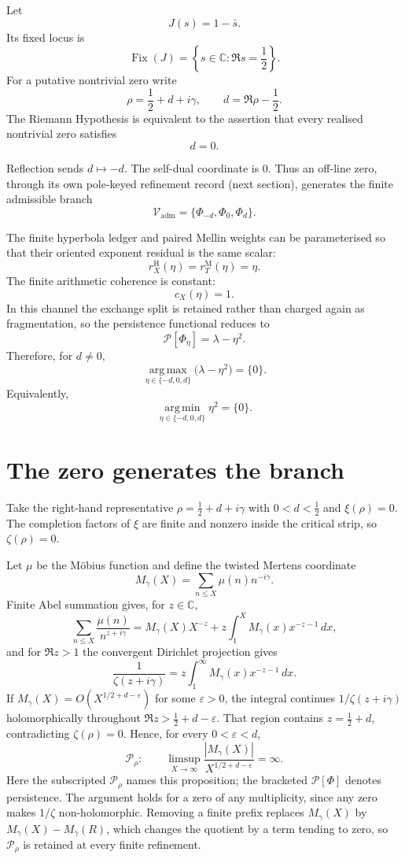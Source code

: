 \documentclass[11pt]{article}
\newcommand{\Pheart}{\mathcal P}
\newcommand{\Fix}{\operatorname{Fix}}
\newcommand{\argmax}{\operatorname*{arg\,max}}
\newcommand{\argmin}{\operatorname*{arg\,min}}
\begin{document}
Let
\[
J(s)=1-\bar s.
\]
Its fixed locus is
\[
\Fix(J)=\left\{s\in\mathbb C:\Re s=\frac12\right\}.
\]
For a putative nontrivial zero write
\[
\rho=\frac12+d+i\gamma,
\qquad
d=\Re\rho-\frac12.
\]
The Riemann Hypothesis is equivalent to the assertion that every realised nontrivial zero satisfies
\[
d=0.
\]

Reflection sends \(d\mapsto-d\). The self-dual coordinate is \(0\). Thus an off-line zero, through its own pole-keyed refinement record (next section), generates the finite admissible branch
\[
\mathcal V_{\mathrm{adm}}
=
\{\Phi_{-d},\Phi_0,\Phi_d\}.
\]

The finite hyperbola ledger and paired Mellin weights can be parameterised so that their oriented exponent residual is the same scalar:
\[
r_X^{\mathrm H}(\eta)
=
r_T^{\mathrm M}(\eta)
=
\eta.
\]
The finite arithmetic coherence is constant:
\[
c_X(\eta)=1.
\]
In this channel the exchange split is retained rather than charged again as fragmentation, so the persistence functional reduces to
\[
\Pheart[\Phi_\eta]
=
\lambda-\eta^2.
\]
Therefore, for \(d\neq0\),
\[
\argmax_{\eta\in\{-d,0,d\}}
\bigl(\lambda-\eta^2\bigr)
=
\{0\}.
\]
Equivalently,
\[
\argmin_{\eta\in\{-d,0,d\}}\eta^2=\{0\}.
\]

\section{The zero generates the branch}

Take the right-hand representative \(\rho=\frac12+d+i\gamma\) with \(0<d<\frac12\) and \(\xi(\rho)=0\). The completion factors of \(\xi\) are finite and nonzero inside the critical strip, so \(\zeta(\rho)=0\).

Let \(\mu\) be the M\"obius function and define the twisted Mertens coordinate
\[
M_\gamma(X)=\sum_{n\le X}\mu(n)n^{-i\gamma}.
\]
Finite Abel summation gives, for \(z\in\mathbb C\),
\[
\sum_{n\le X}\frac{\mu(n)}{n^{z+i\gamma}}
=
M_\gamma(X)X^{-z}
+
z\int_1^X M_\gamma(x)x^{-z-1}\,dx,
\]
and for \(\Re z>1\) the convergent Dirichlet projection gives
\[
\frac1{\zeta(z+i\gamma)}
=
z\int_1^\infty M_\gamma(x)x^{-z-1}\,dx.
\]
If \(M_\gamma(X)=O\!\left(X^{1/2+d-\varepsilon}\right)\) for some \(\varepsilon>0\), the integral continues \(1/\zeta(z+i\gamma)\) holomorphically throughout \(\Re z>\frac12+d-\varepsilon\). That region contains \(z=\frac12+d\), contradicting \(\zeta(\rho)=0\). Hence, for every \(0<\varepsilon<d\),
\[
\mathcal P_\rho:
\qquad
\limsup_{X\to\infty}
\frac{|M_\gamma(X)|}{X^{1/2+d-\varepsilon}}
=
\infty.
\]
Here the subscripted \(\mathcal P_\rho\) names this proposition; the bracketed \(\Pheart[\Phi]\) denotes persistence. The argument holds for a zero of any multiplicity, since any zero makes \(1/\zeta\) non-holomorphic. Removing a finite prefix replaces \(M_\gamma(X)\) by \(M_\gamma(X)-M_\gamma(R)\), which changes the quotient by a term tending to zero, so \(\mathcal P_\rho\) is retained at every finite refinement.
\end{document}
